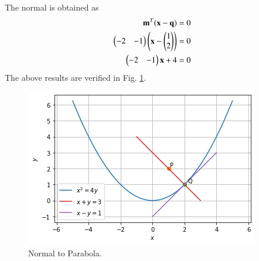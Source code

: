 The normal is obtained as 
\begin{align}
\mathbf{m}^T(\mathbf{x} - \mathbf{q}) &=0 
\\
\begin{pmatrix}-2 & -1\end{pmatrix}\left(\mathbf{x}-\begin{pmatrix}1 \\ 2\end{pmatrix}\right) &= 0
\\
\begin{pmatrix}-2 & -1\end{pmatrix}\mathbf{x}+ 4 &= 0 
\end{align}
%
The above results are verified in Fig.     \ref{quadform/45/fig:Normal to parabola.}.
\begin{figure}[ht]
    \centering
    \includegraphics[width=\columnwidth]{solutions/su2021/2/45/FIGURE4.png}
    \caption{Normal to Parabola.}
    \label{quadform/45/fig:Normal to parabola.}
\end{figure}    

